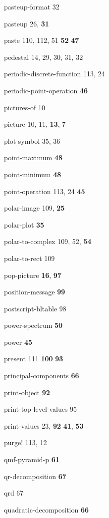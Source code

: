 \begin{theindex}
\item {\ptt pasteup-format} 32
\item {\ptt pasteup} 26, {\bf 31}
\item {\ptt paste} 110, 112, 51
 {\bf 52}
 {\bf 47}
\item {\ptt pedestal} 14, 29, 30, 31, 32
\item {\ptt periodic-discrete-function} 113, 24
\item {\ptt periodic-point-operation}
 {\bf 46}
\item {\ptt pictures-of} 10
\item {\ptt picture} 10, 11, {\bf 13}, 7
\item {\ptt plot-symbol} 35, 36
\item {\ptt point-maximum}
 {\bf 48}
\item {\ptt point-minimum}
 {\bf 48}
\item {\ptt point-operation} 113, 24
 {\bf 45}
\item {\ptt polar-image} 109, {\bf 25}
\item {\ptt polar-plot} {\bf 35}
\item {\ptt polar-to-complex} 109, 52, {\bf 54}
\item {\ptt polar-to-rect} 109
\item {\ptt pop-picture} {\bf 16}, {\bf 97}
\item {\ptt position-message} {\bf 99}
\item {\ptt postscript-bltable} 98
\item {\ptt power-spectrum}
 {\bf 50}
\item {\ptt power}
 {\bf 45}
\item {\ptt present} 111
 {\bf 100}
 {\bf 93}
\item {\ptt principal-components} {\bf 66}
\item {\ptt print-object} {\bf 92}
\item {\ptt print-top-level-values} 95
\item {\ptt print-values} 23, {\bf 92}
 {\bf 41}, {\bf 53}
\item {\ptt purge!} 113, 12
\item {\ptt qmf-pyramid-p} {\bf 61}
\item {\ptt qr-decomposition} {\bf 67}
\item {\ptt qrd} 67
\item {\ptt quadratic-decomposition} {\bf 66}

\end{theindex}
